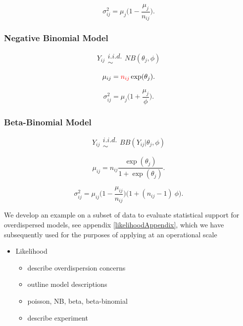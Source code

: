 \documentclass[12pt]{article}
\begin{document}
%
\begin{equation}
\sigma^2_{ij} = \mu_{j}\Big(1-\frac{\mu_{j}}{n_{ij}}\Big).
\end{equation}

%
\subsubsection{Negative Binomial Model}

%
\begin{equation}
Y_{ij} \substack{i.i.d.\\\sim} NB(\theta_{j}, \phi)
\end{equation}

%
\begin{equation}
\mu_{ij} = {\color{red}n_{ij}} \exp(\theta_{j}).
\end{equation}

%
\begin{equation}
\sigma^2_{ij} = \mu_{j}\Big(1+\frac{\mu_{j}}{\phi}\Big).
\end{equation}

%
\subsubsection{Beta-Binomial Model}

%
\begin{equation}
Y_{ij} \substack{i.i.d.\\\sim} BB(Y_{ij}|\theta_{j}, \phi)
\end{equation}

%
\begin{equation}
\mu_{ij} = n_{ij}\frac{\exp(\theta_{j})}{1+\exp(\theta_{j})}.
\end{equation}

%
\begin{equation}
\sigma^2_{ij} = \mu_{ij}\Big(1-\frac{\mu_{ij}}{n_{ij}}\Big)\Big(1+(n_{ij}-1)~\phi\Big).
\end{equation}


We develop an example on a subset of data to evaluate statistical support for 
overdispersed models, see appendix \ref{likelihoodAppendix}, which we have subsequently used for the purposes of applying at an operational scale 

\begin{itemize}
\item Likelihood
	\begin{itemize}
	\item describe overdispersion concerns
	\item outline model descriptions
	\item poisson, NB, beta, beta-binomial
	\item describe experiment
	\end{itemize}
\end{itemize}
\end{document}
